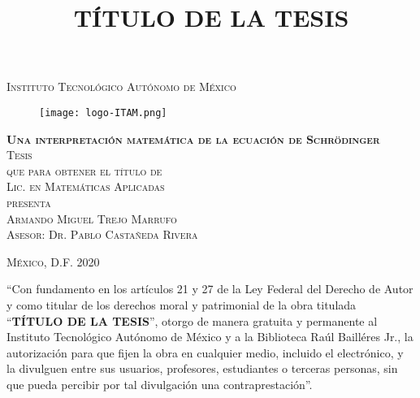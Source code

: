 \documentclass[12pt]{article}
\theoremstyle{definition}
\begin{document}
\title{TÍTULO DE LA TESIS} %

\begin{titlepage}
\begin{center}

\textsc{\Large Instituto Tecnológico Autónomo de México}\\[4em]

\begin{figure}[h]
\begin{center}
\texttt{[image: logo-ITAM.png]}
\end{center}
\end{figure}

\vspace{4em}

\textsc{\huge \textbf{Una interpretación matemática de la ecuación de Schrödinger}}\\[4em]

\textsc{\large Tesis}\\[1em]

\textsc{que para obtener el título de}\\[1em]

\textsc{Lic. en Matemáticas Aplicadas}\\[1em]

\textsc{presenta}\\[1em]

\textsc{\Large Armando Miguel Trejo Marrufo}\\[1em]

\textsc{\large Asesor: Dr. Pablo Castañeda Rivera}

\end{center}

\vspace*{\fill}
\textsc{México, D.F. \hspace*{\fill} 2020}

\end{titlepage}



\thispagestyle{empty}
\vspace*{\fill}
\begingroup
``Con fundamento en los artículos 21 y 27 de la Ley Federal del Derecho de Autor y como titular de los derechos moral y patrimonial de la obra titulada ``\textbf{TÍTULO DE LA TESIS}'', otorgo de manera gratuita y permanente al Instituto Tecnológico Autónomo de México y a la Biblioteca Raúl Bailléres Jr., la autorización para que fijen la obra en cualquier medio, incluido el electrónico, y la divulguen entre sus usuarios, profesores, estudiantes o terceras personas, sin que pueda percibir por tal divulgación una contraprestación''.
\end{document}
